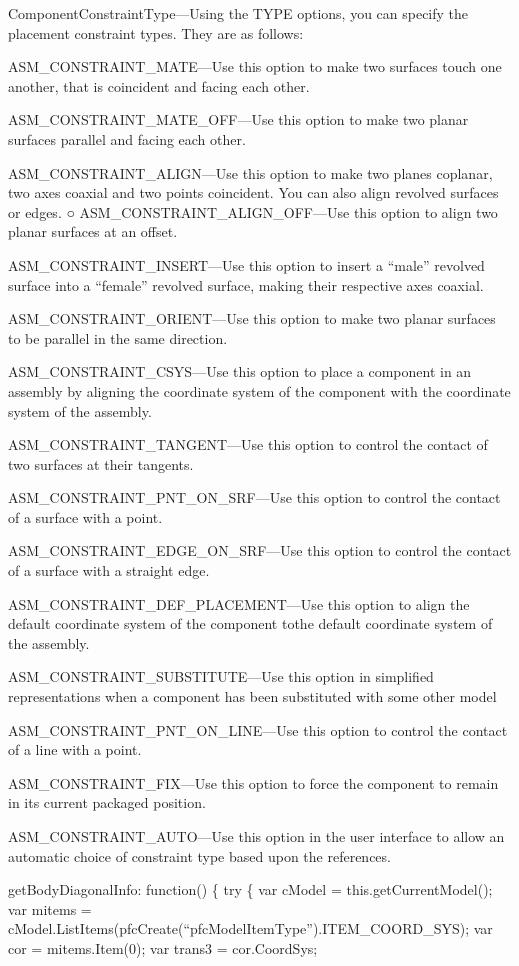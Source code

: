 \documentclass[]{article}
\begin{document}
ComponentConstraintType---Using the TYPE options, you can specify the
placement constraint types. They are as follows:

ASM\_CONSTRAINT\_MATE---Use this option to make two surfaces touch one
another, that is coincident and facing each other.

ASM\_CONSTRAINT\_MATE\_OFF---Use this option to make two planar surfaces
parallel and facing each other.

ASM\_CONSTRAINT\_ALIGN---Use this option to make two planes coplanar,
two axes coaxial and two points coincident. You can also align revolved
surfaces or edges. ○ ASM\_CONSTRAINT\_ALIGN\_OFF---Use this option to
align two planar surfaces at an offset.

ASM\_CONSTRAINT\_INSERT---Use this option to insert a ``male'' revolved
surface into a ``female'' revolved surface, making their respective axes
coaxial.

ASM\_CONSTRAINT\_ORIENT---Use this option to make two planar surfaces to
be parallel in the same direction.

ASM\_CONSTRAINT\_CSYS---Use this option to place a component in an
assembly by aligning the coordinate system of the component with the
coordinate system of the assembly.

ASM\_CONSTRAINT\_TANGENT---Use this option to control the contact of two
surfaces at their tangents.

ASM\_CONSTRAINT\_PNT\_ON\_SRF---Use this option to control the contact
of a surface with a point.

ASM\_CONSTRAINT\_EDGE\_ON\_SRF---Use this option to control the contact
of a surface with a straight edge.

ASM\_CONSTRAINT\_DEF\_PLACEMENT---Use this option to align the default
coordinate system of the component tothe default coordinate system of
the assembly.

ASM\_CONSTRAINT\_SUBSTITUTE---Use this option in simplified
representations when a component has been substituted with some other
model

ASM\_CONSTRAINT\_PNT\_ON\_LINE---Use this option to control the contact
of a line with a point.

ASM\_CONSTRAINT\_FIX---Use this option to force the component to remain
in its current packaged position.

ASM\_CONSTRAINT\_AUTO---Use this option in the user interface to allow
an automatic choice of constraint type based upon the references.

getBodyDiagonalInfo: function() \{ try \{ var cModel =
this.getCurrentModel();\\ var mitems =
cModel.ListItems(pfcCreate(``pfcModelItemType'').ITEM\_COORD\_SYS); var
cor = mitems.Item(0); var trans3 = cor.CoordSys;
\end{document}
